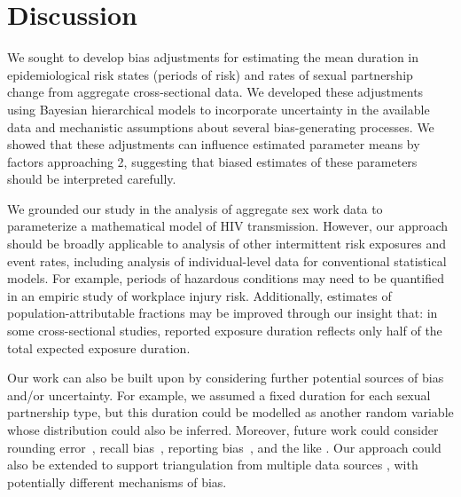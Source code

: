 \section{Discussion}
We sought to develop bias adjustments for estimating
the mean duration in epidemiological risk states (periods of risk)
and rates of sexual partnership change
from aggregate cross-sectional data.
We developed these adjustments using Bayesian hierarchical models to incorporate
uncertainty in the available data and
mechanistic assumptions about several bias-generating processes.
We showed that these adjustments can influence
estimated parameter means by factors approaching 2,
suggesting that biased estimates of these parameters
should be interpreted carefully.
\par
We grounded our study in the analysis of aggregate sex work data
to parameterize a mathematical model of HIV transmission.
However, our approach should be broadly applicable to
analysis of other intermittent risk exposures and event rates,
including analysis of individual-level data for conventional statistical models.
For example, periods of hazardous conditions may need to be quantified
in an empiric study of workplace injury risk.
Additionally, estimates of population-attributable fractions
may be improved through our insight that: in some cross-sectional studies,
reported exposure duration reflects only half of the total expected exposure duration.
\par
Our work can also be built upon by considering
further potential sources of bias and/or uncertainty.
For example, we assumed a fixed duration for each sexual partnership type,
but this duration could be modelled as another random variable
whose distribution could also be inferred.
Moreover, future work could consider
rounding error~\cite{Mills2014},
recall bias~\cite{Ramjee1999},
reporting bias~\cite{Lowndes2012},
and the like \cite{Fenton2001}.
Our approach could also be extended to support
triangulation from multiple data sources \cite{Lawlor2016},
with potentially different mechanisms of bias.
